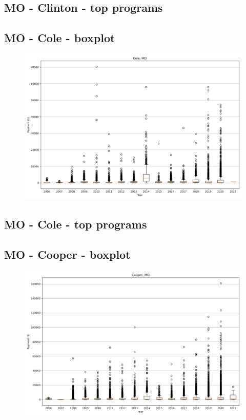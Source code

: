 \subsection*{MO - Clinton - top programs}

\newpage
\subsection*{MO - Cole - boxplot}
\begin{figure}[h]
\centering
\includegraphics[width=7in]{../output/boxplots/counties/Cole-MO_boxplot.png}
\end{figure}


\subsection*{MO - Cole - top programs}

\newpage
\subsection*{MO - Cooper - boxplot}
\begin{figure}[h]
\centering
\includegraphics[width=7in]{../output/boxplots/counties/Cooper-MO_boxplot.png}
\end{figure}



